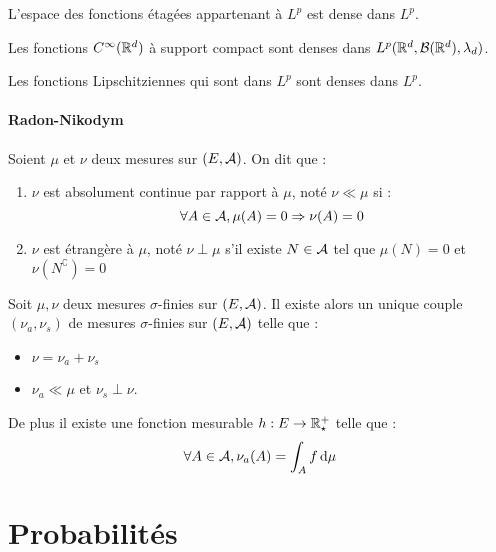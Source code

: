 \documentclass{cours}
\begin{document}
\begin{theorem}
    L'espace des fonctions étagées appartenant à $L^{p}$ est dense dans $L^{p}$.
\end{theorem}

\begin{theorem}
    Les fonctions $C^{\infty}(\mathbb{R}^{d})$ à support compact sont denses dans $L^{p}(\mathbb{R}^{d}, \mathcal{B}(\mathbb{R}^{d}), \lambda_{d})$.
\end{theorem}

\begin{lemma}
    Les fonctions Lipschitziennes qui sont dans $L^{p}$ sont denses dans $L^{p}$.
\end{lemma}

\subsection{Radon-Nikodym}
\begin{definition}
    Soient $\mu$ et $\nu$ deux mesures sur $\left(E, \mathcal{A}\right)$. On dit que :
    \begin{enumerate}
        \item $\nu$ est absolument continue par rapport à $\mu$, noté $\nu \ll \mu$ si :
              \[
                  \forall A \in \mathcal{A}, \mu(A) = 0 \Rightarrow \nu(A) = 0
              \]
        \item $\nu$ est étrangère à $\mu$, noté $\nu \perp \mu$ s'il existe $N \in \mathcal{A}$ tel que $\mu(N) = 0$ et $\nu(N^{\complement}) = 0$
    \end{enumerate}
\end{definition}

\begin{theorem}
    Soit $\mu, \nu$ deux mesures $\sigma$-finies sur $\left(E, \mathcal{A}\right)$. Il existe alors un unique couple $\left(\nu_{a}, \nu_{s}\right)$ de mesures $\sigma$-finies sur $\left(E, \mathcal{A}\right)$ telle que :
    \begin{itemize}
        \item $\nu = \nu_{a} + \nu_{s}$
        \item $\nu_{a} \ll \mu$ et $\nu_{s} \perp \nu$.
    \end{itemize}
    De plus il existe une fonction mesurable $h : E \rightarrow \mathbb{R}_{\star}^{+}$ telle que :
    \[
        \forall A \in \mathcal{A}, \nu_{a}(A) = \int_{A}f {\rm \, d}\mu
    \]
\end{theorem}


\part{Probabilités}
\end{document}
